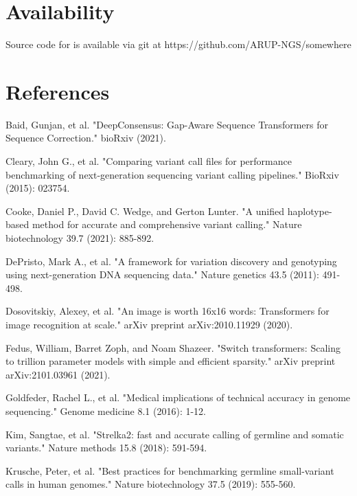 \documentclass[]{article}
\begin{document}
\section{Availability}
 
 Source code for is available via git at https://github.com/ARUP-NGS/somewhere
 
\section{References}

\vspace{8pt}
Baid, Gunjan, et al. "DeepConsensus: Gap-Aware Sequence Transformers for Sequence Correction." bioRxiv (2021).

\vspace{8pt}
Cleary, John G., et al. "Comparing variant call files for performance benchmarking of next-generation sequencing variant calling pipelines." BioRxiv (2015): 023754.

\vspace{8pt}
Cooke, Daniel P., David C. Wedge, and Gerton Lunter. "A unified haplotype-based method for accurate and comprehensive variant calling." Nature biotechnology 39.7 (2021): 885-892.

\vspace{8pt}
DePristo, Mark A., et al. "A framework for variation discovery and genotyping using next-generation DNA sequencing data." Nature genetics 43.5 (2011): 491-498.
 
\vspace{8pt}
Dosovitskiy, Alexey, et al. "An image is worth 16x16 words: Transformers for image recognition at scale." arXiv preprint arXiv:2010.11929 (2020).

\vspace{8pt}
Fedus, William, Barret Zoph, and Noam Shazeer. "Switch transformers: Scaling to trillion parameter models with simple and efficient sparsity." arXiv preprint arXiv:2101.03961 (2021).


\vspace{8pt}
Goldfeder, Rachel L., et al. "Medical implications of technical accuracy in genome sequencing." Genome medicine 8.1 (2016): 1-12.

\vspace{8pt}
Kim, Sangtae, et al. "Strelka2: fast and accurate calling of germline and somatic variants." Nature methods 15.8 (2018): 591-594.

\vspace{8pt}
Krusche, Peter, et al. "Best practices for benchmarking germline small-variant calls in human genomes." Nature biotechnology 37.5 (2019): 555-560.
\end{document}

